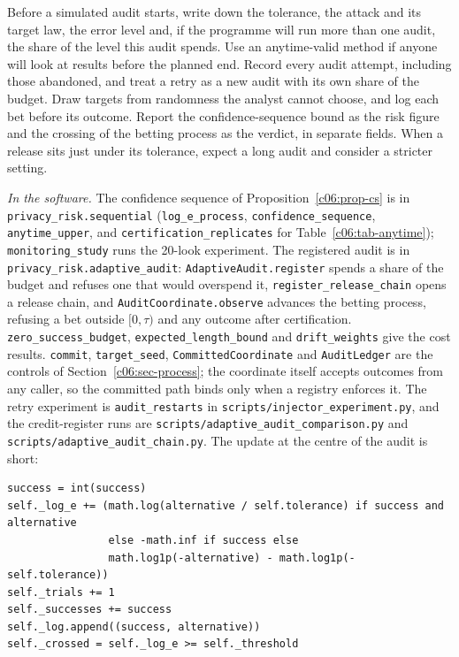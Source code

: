 \begin{inpractice}\sloppy
Before a simulated audit starts, write down the tolerance, the attack and its
target law, the error level and, if the programme will run more than one audit,
the share of the level this audit spends. Use an anytime-valid method if anyone
will look at results before the planned end. Record every audit attempt, including
those abandoned, and treat a retry as a new audit with its own share of the
budget. Draw targets from randomness the analyst cannot choose, and log each bet
before its outcome. Report the confidence-sequence bound as the risk figure and the
crossing of the betting process as the verdict, in separate fields. When a release
sits just under its tolerance, expect a long audit and consider a stricter setting.

\smallskip\noindent\textit{In the software.} The confidence sequence of
Proposition~\ref{c06:prop-cs} is in \texttt{privacy\_risk.sequential}
(\texttt{log\_e\_process}, \texttt{confidence\_sequence}, \texttt{anytime\_upper},
and \texttt{certification\_replicates} for Table~\ref{c06:tab-anytime});
\texttt{monitoring\_study} runs the 20-look experiment. The registered audit is in
\texttt{privacy\_risk.adaptive\_audit}: \texttt{AdaptiveAudit.register} spends a
share of the budget and refuses one that would overspend it,
\texttt{register\_release\_chain} opens a release chain, and
\texttt{AuditCoordinate.observe} advances the betting process, refusing a bet
outside $[0,\tau)$ and any outcome after certification. \texttt{zero\_success\_budget},
\texttt{expected\_length\_bound} and \texttt{drift\_weights} give the cost results.
\texttt{commit}, \texttt{target\_seed}, \texttt{CommittedCoordinate} and
\texttt{AuditLedger} are the controls of Section~\ref{c06:sec-process}; the
coordinate itself accepts outcomes from any caller, so the committed path binds only
when a registry enforces it. The retry experiment is \texttt{audit\_restarts} in
\texttt{scripts/injector\_experiment.py}, and the credit-register runs are
\texttt{scripts/adaptive\_audit\_comparison.py} and
\texttt{scripts/adaptive\_audit\_chain.py}. The update at the centre of the audit is
short:
\begin{lstlisting}
success = int(success)
self._log_e += (math.log(alternative / self.tolerance) if success and alternative
                else -math.inf if success else
                math.log1p(-alternative) - math.log1p(-self.tolerance))
self._trials += 1
self._successes += success
self._log.append((success, alternative))
self._crossed = self._log_e >= self._threshold
\end{lstlisting}
\end{inpractice}


